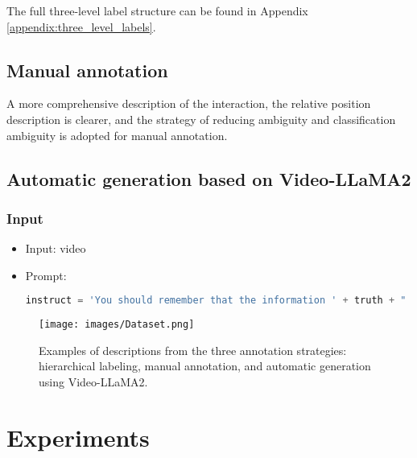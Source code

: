 \documentclass[lettersize,journal]{IEEEtran}
\begin{document}
The full three-level label structure can be found in Appendix \ref{appendix:three_level_labels}.

\subsection{Manual annotation}

A more comprehensive description of the interaction, the relative position description is clearer, and the strategy of reducing ambiguity and classification ambiguity is adopted for manual annotation.

\subsection{Automatic generation based on Video-LLaMA2}
\subsubsection{Input}
\begin{itemize}
    \item Input: video
    \item Prompt:
    \begin{lstlisting}[language=Python, basicstyle=\ttfamily\small, breaklines=true,  showspaces=false, showstringspaces=false]
instruct = 'You should remember that the information ' + truth + " is a truth.Describe the content of the video and you must according to the truth to adjust your answer.You should focus on the driving status of the ego vehicle itself and the driving status of the leading vehicle, the interactions with other road users in detail, and add any other factors that may affect the driving of the ego vehicle to make your answer cover more aspects that are not given by the truth but appear in the video. You should summarize your answer to make it concise and avoid the description about the background scenery such as buildings and trees.You should not describe the background information. "
\end{lstlisting}
\end{itemize}


\begin{figure}
    \centering
    \texttt{[image: images/Dataset.png]}
    \caption{Examples of descriptions from the three annotation strategies: hierarchical labeling, manual annotation, and automatic generation using Video-LLaMA2.}
    \label{fig:2}
\end{figure}
\section{Experiments}
\end{document}
